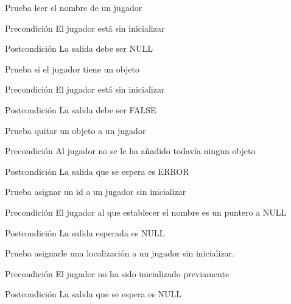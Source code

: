 \begin{DoxyRefList}
\item[\label{test__test000217}%
\hypertarget{test__test000217}{}%
Global \hyperlink{player__test_8c_a3aa908fd360b74e7786422260e8e16a0}{test2\-\_\-player\-\_\-get\-\_\-name} ()]Prueba leer el nombre de un jugador \begin{DoxyPrecond}{Precondición}
El jugador está sin inicializar 
\end{DoxyPrecond}
\begin{DoxyPostcond}{Postcondición}
La salida debe ser N\-U\-L\-L  
\end{DoxyPostcond}

\item[\label{test__test000001}%
\hypertarget{test__test000001}{}%
Global \hyperlink{player__test_8c_ae8953d45d8f555a930dbc8aba101d399}{test2\-\_\-player\-\_\-has\-\_\-object} ()]Prueba si el jugador tiene un objeto \begin{DoxyPrecond}{Precondición}
El jugador está sin inicializar 
\end{DoxyPrecond}
\begin{DoxyPostcond}{Postcondición}
La salida debe ser F\-A\-L\-S\-E  
\end{DoxyPostcond}

\item[\label{test__test000226}%
\hypertarget{test__test000226}{}%
Global \hyperlink{player__test_8c_af9e74e12ad6961761f1ff61afa56be3e}{test2\-\_\-player\-\_\-remove\-\_\-object} ()]Prueba quitar un objeto a un jugador \begin{DoxyPrecond}{Precondición}
Al jugador no se le ha añadido todavía ningun objeto 
\end{DoxyPrecond}
\begin{DoxyPostcond}{Postcondición}
La salida que se espera es E\-R\-R\-O\-R  
\end{DoxyPostcond}

\item[\label{test__test000208}%
\hypertarget{test__test000208}{}%
Global \hyperlink{player__test_8c_a3695e0896bc3d770290e6a691fa212f7}{test2\-\_\-player\-\_\-set\-\_\-id} ()]Prueba asignar un id a un jugador sin inicializar \begin{DoxyPrecond}{Precondición}
El jugador al que establecer el nombre es un puntero a N\-U\-L\-L 
\end{DoxyPrecond}
\begin{DoxyPostcond}{Postcondición}
La salida esperada es N\-U\-L\-L  
\end{DoxyPostcond}

\item[\label{test__test000211}%
\hypertarget{test__test000211}{}%
Global \hyperlink{player__test_8c_a2c702753d9e2e3df9ef4abf2d1b9bc8d}{test2\-\_\-player\-\_\-set\-\_\-location} ()]Prueba asignarle una localización a un jugador sin inicializar. \begin{DoxyPrecond}{Precondición}
El jugador no ha sido inicializado previamente 
\end{DoxyPrecond}
\begin{DoxyPostcond}{Postcondición}
La salida que se espera es N\-U\-L\-L  
\end{DoxyPostcond}


\end{DoxyRefList}
